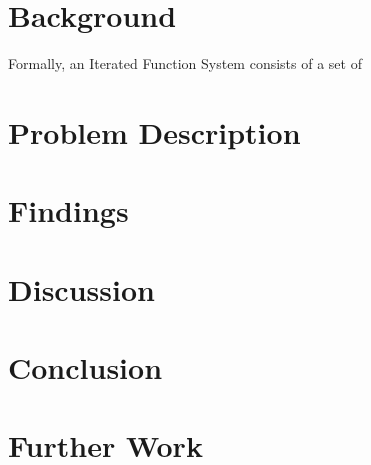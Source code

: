 \documentclass[11pt]{article}
\begin{document}
\section{Background}
\label{sec:orgc91d23c}

Formally, an Iterated Function System consists of a set of 

\section{Problem Description}
\label{sec:org60f7c03}

\section{Findings}
\label{sec:org767e78c}

\section{Discussion}
\label{sec:orgb94cebb}

\section{Conclusion}
\label{sec:orgfc1a3a4}

\section{Further Work}
\label{sec:org2d3b322}
\end{document}

